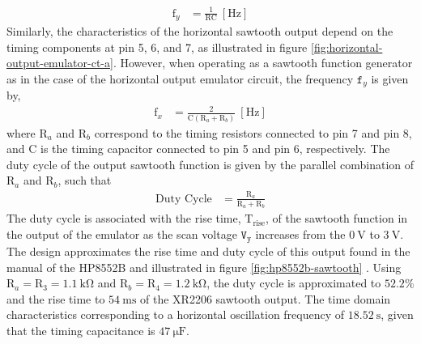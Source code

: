 \documentclass[class=report,11pt,crop=false]{standalone}
\begin{document}
	\begin{align}\label{eqn:xr2206-sinewave-frequency}
		\text{f}_y	& = \frac{1}{\text{R}\text{C}} ~ [\si{\hertz}]
	\end{align}
	Similarly, the characteristics of the horizontal sawtooth output depend on the timing components at pin 5, 6, and 7, as illustrated in figure \ref{fig:horizontal-output-emulator-ct-a}. However, when operating as a sawtooth function generator as in the case of the horizontal output emulator circuit, the frequency $\texttt{f}_y$ is given by,
	\begin{align}\label{eqn:xr2206-sawtooth-frequency}
		\text{f}_x	& = \frac{2}{\text{C}(\text{R}_a + \text{R}_b)} ~ [\si{\hertz}]
	\end{align}
	where $\text{R}_a$ and $\text{R}_b$ correspond to the timing resistors connected to pin 7 and pin 8, and $\text{C}$ is the timing capacitor connected to pin 5 and pin 6, respectively. The duty cycle of the output sawtooth function is given by the parallel combination of $\text{R}_a$ and $\text{R}_b$, such that 
	\begin{align}\label{eqn:xr2206-duty-cycle}
		\text{Duty Cycle}	& = \frac{\text{R}_a}{\text{R}_a + \text{R}_b}
	\end{align}
	The duty cycle is associated with the rise time, $\text{T}_\text{rise}$, of the sawtooth function in the output of the emulator as the scan voltage $\texttt{V}_\texttt{y}$ increases from the $\SI{0}{\volt}$ to $\SI{3}{\volt}$. The design approximates the rise time and duty cycle of this output found in the manual of the HP8552B and illustrated in figure \ref{fig:hp8552b-sawtooth} \cite{hp8552b}. Using $\text{R}_a = \text{R}_3 = \SI{1.1}{\kilo\ohm}$ and $\text{R}_b = \text{R}_4 = \SI{1.2}{\kilo\ohm}$, the duty cycle is approximated to $52.2\%$ and the rise time to $\SI{54}{\milli\second}$ of the XR2206 sawtooth output. The time domain characteristics corresponding to a horizontal oscillation frequency of $\SI{18.52}{\second}$, given that the timing capacitance is $\SI{47}{\micro\farad}$. 
\end{document}
